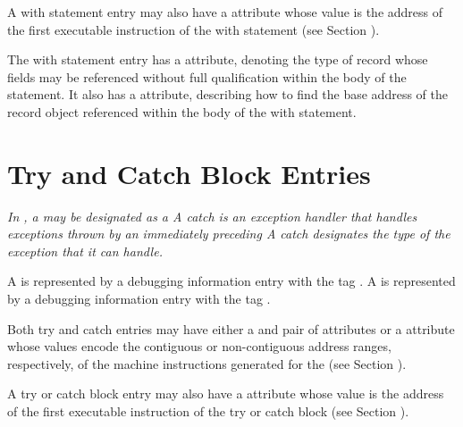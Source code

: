 A\hypertarget{chap:DWATentrypcofwithstmt}{}
with statement entry may also have a
\DWATentrypc{} attribute
whose value is the address of the first executable instruction
of the with statement (see 
Section ).

The with statement entry has a
\DWATtype{} attribute, denoting
the type of record whose fields may be referenced without full
qualification within the body of the statement. It also has
a \DWATlocation{} attribute, describing how to find the base
address of the record object referenced within the body of
the with statement.

\section{Try and Catch Block Entries}
\label{chap:tryandcatchblockentries}
\textit{In , a  may be 
designated as a  
A catch  is an exception handler that 
handles exceptions thrown by an immediately preceding 
A catch  
designates the type of the exception that it can handle.}

A  is represented 
by a debugging information entry
with the tag \DWTAGtryblockTARG.  
A  is represented by
a debugging information entry
with the tag \DWTAGcatchblockTARG.

Both try and catch  entries may have either a
\DWATlowpc{} and 
\DWAThighpc{} pair of attributes 
or a
\DWATranges{} attribute 
whose values encode the contiguous
or non-contiguous address ranges, respectively, of the
machine instructions generated for the 
(see Section ).

A\hypertarget{chap:DWATentrypcoftryblock}{}
try or catch\hypertarget{chap:DWATentrypcofcatchblock}{}
block entry may also have a
\DWATentrypc{} attribute
whose value is the address of the first executable instruction
of the try or catch block 
(see Section ).

